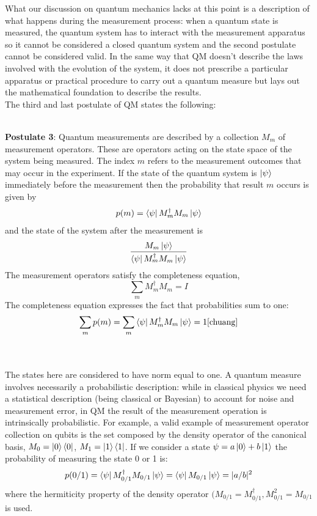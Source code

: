 \documentclass[journal, letterpaper]{IEEEtran}
\begin{document}
What our discussion on quantum mechanics lacks at this point is a description of what happens during the measurement process: when a quantum state is measured, the quantum system has to interact with the measurement apparatus so it cannot be considered a closed quantum system and the second postulate cannot be considered valid. In the same way that QM doesn't describe the laws involved with the evolution of the system, it does not prescribe a particular apparatus or practical procedure to carry out a quantum measure but lays out the mathematical foundation to describe the results.\\
The third and last postulate of QM states the following:\\ \\

\begin{minipage}{0.96\linewidth}
\textbf{Postulate 3}:  Quantum measurements are described by a collection {$M_m$} of measurement operators. These are operators acting on the state space of the system being measured. The index $m$ refers to the measurement outcomes that may occur in the experiment. If the state of the quantum system is $\ket{\psi}$ immediately before the measurement then the probability that result $m$ occurs is given by
\[p(m) = \bra{\psi}M^\dagger_m M_m\ket{\psi}\]
and the state of the system after the measurement is
\[\frac{M_m\ket{\psi}}{\bra{\psi}M^\dagger_m M_m \ket{\psi}}\]
The measurement operators satisfy the completeness equation,
\[\sum_m M^\dagger_m M_m = I\]
The completeness equation expresses the fact that probabilities sum to one:
\[ \sum_m p(m) = \sum_m \bra{\psi}M^\dagger_m M_m\ket{\psi}=1\cite{chuang}\]
\end{minipage} \\ \\
The states here are considered to have norm equal to one.
A quantum measure involves necessarily a probabilistic description: while in classical physics we need a statistical description (being classical or Bayesian) to account for noise and measurement error, in QM the result of the measurement operation is intrinsically probabilistic. 
For example, a valid example of measurement operator collection on qubits is the set composed by the density operator of the canonical basis, \(M_0 = \ket{0}\bra{0}\), \(M_1 = \ket{1}\bra{1}\). If we consider a state $\psi = a\ket{0} + b\ket{1}$ the probability of measuring the state 0 or 1 is:
\[p(0/1) = \bra{\psi}M_{0/1}^\dagger M_{0/1} \ket{\psi} = \bra{\psi} M_{0/1} \ket{\psi} = |a/b|^2\] 
where the hermiticity property of the density operator $(M_{0/1} =M_{0/1}^\dagger, M_{0/1}^2=M_{0/1}$ is used. 
\end{document}
